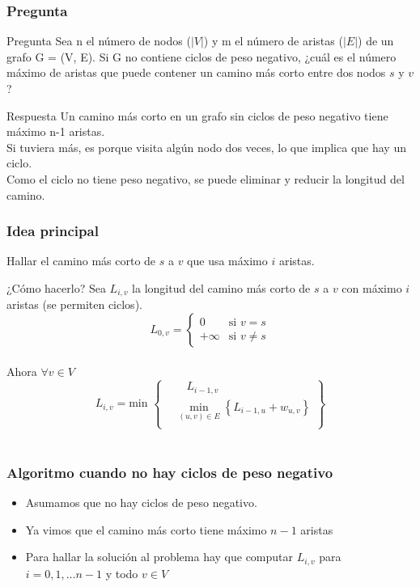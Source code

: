 \documentclass{beamer}
\begin{document}
	\begin{frame}
		\frametitle{Pregunta}
		\begin{alertblock}{Pregunta}
			Sea n el número de nodos ($|V|$) y m el número de aristas ($|E|$) de un grafo G = (V, E). Si G no contiene ciclos de peso negativo, ¿cuál es el número máximo de aristas que puede contener un camino más corto entre dos nodos $s$ y $v$?
		\end{alertblock}
		\pause
		\begin{exampleblock}{Respuesta}
			Un camino más corto en un grafo sin ciclos de peso negativo tiene máximo n-1 aristas. \\
			Si tuviera más, es porque visita algún nodo dos veces, lo que implica que hay un ciclo. \\
			Como el ciclo no tiene peso negativo, se puede eliminar y reducir la longitud del camino.
		\end{exampleblock}
	\end{frame}
	
	\begin{frame}
		\frametitle{Idea principal}
		Hallar el camino más corto de $s$ a $v$ que usa máximo $i$ aristas.\\
		\begin{block}{¿Cómo hacerlo?}
			Sea $L_{i,v} $ la longitud del camino más corto de $s$ a $v$ con máximo $i$ aristas (se permiten ciclos).\\
			\[
				L_{0,v} =
				\begin{cases}
					0        &\text{si } v = s\\
					+\infty  &\text{si } v \neq s
				\end{cases}
			\]\\
			Ahora $\forall v \in V$\\
			\[ 
				L_{i,v} = \text{min } 
				\left\{
					\begin{aligned}
						& \quad L_{i-1,v}\\
						& \operatorname*{min}_{(u, v) \in E}  \left\{L_{i-1, u} + w_{u,v} \right\}\\
					\end{aligned}
				\right\}
			\]
			\quad \\
		\end{block}
	\end{frame}
	
	\begin{frame}
		\frametitle{Algoritmo cuando no hay ciclos de peso negativo}
		\begin{itemize}
			\item Asumamos que no hay ciclos de peso negativo.\\
			\item Ya vimos que el camino más corto tiene máximo $n-1$ aristas\\
			\item Para hallar la solución al problema hay que computar $L_{i, v}$ para $i = 0, 1, \ldots n-1$ y todo $v \in V$
		\end{itemize}
	\end{frame}
	
\end{document}
